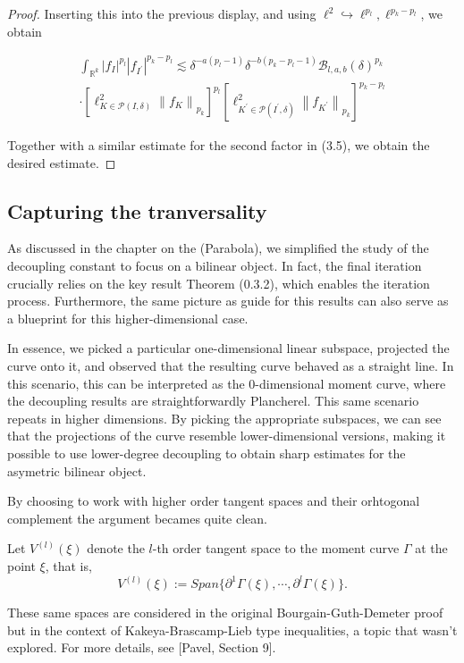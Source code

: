 \begin{proof}
Inserting this into the previous display, and using $\ell^{2} \hookrightarrow \ell^{p_{l}}, \ell^{p_{k}-p_{l}}$, we obtain

$$
\begin{aligned}
\int_{\mathbb{R}^{k}}\left|f_{I}\right|^{p_{l}}\left|f_{I^{\prime}}\right|^{p_{k}-p_{l}} \lesssim \delta^{-a\left(p_{l}-1\right)} \delta^{-b\left(p_{k}-p_{l}-1\right)} \mathcal{B}_{l, a, b}(\delta)^{p_{k}} \\
\cdot\left[\ell_{K \in \mathcal{P}(I, \delta)}^{2}\left\|f_{K}\right\|_{p_{k}}\right]^{p_{l}}\left[\ell_{K^{\prime} \in \mathcal{P}\left(I^{\prime}, \delta\right)}^{2}\left\|f_{K^{\prime}}\right\|_{p_{k}}\right]^{p_{k}-p_{l}}
\end{aligned}
$$

Together with a similar estimate for the second factor in (3.5), we obtain the desired estimate.
\end{proof}


\subsection{Capturing the tranversality}
As discussed in the chapter on the (Parabola), we simplified the study of the decoupling constant to focus on a bilinear object.
In fact, the final iteration crucially relies on the key result Theorem (0.3.2), which enables the iteration process. 
Furthermore, the same picture as guide for this results can also serve as a blueprint for this higher-dimensional case.

In essence, we picked a particular one-dimensional linear subspace, projected the curve onto it, and observed that the resulting curve behaved
as a straight line. 
In this scenario, this can be interpreted as the 0-dimensional moment curve, where the decoupling results are straightforwardly Plancherel.
This same scenario repeats in higher dimensions. By picking the appropriate subspaces, we can see that the projections 
of the curve resemble lower-dimensional versions, making it possible to use lower-degree decoupling to obtain sharp estimates for 
the asymetric bilinear object.

By choosing to work with higher order tangent spaces and their orhtogonal complement the argument becames quite clean.
\begin{defn}
    Let $V^{(l)}(\xi)$ denote the $l$-th order tangent space to the moment curve $\Gamma$ at the point $\xi$, that is, 
    \begin{equation*}
        V^{(l)}(\xi):= Span\{ \partial^1 \Gamma(\xi),\cdots,\partial^l \Gamma(\xi)\}.
    \end{equation*}
\end{defn}
\begin{rmk}
    These same spaces are considered in the original Bourgain-Guth-Demeter proof but in the context of Kakeya-Brascamp-Lieb type inequalities, 
    a topic that wasn't explored. For more details, see [Pavel, Section 9]. 
\end{rmk}

